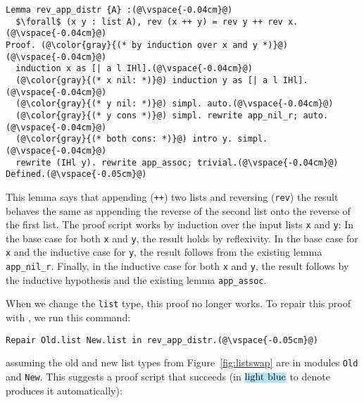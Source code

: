 \begin{lstlisting}
Lemma rev_app_distr {A} :(@\vspace{-0.04cm}@)
  $\forall$ (x y : list A), rev (x ++ y) = rev y ++ rev x.(@\vspace{-0.04cm}@)
Proof. (@\color{gray}{(* by induction over x and y *)}@)(@\vspace{-0.04cm}@)
  induction x as [| a l IHl].(@\vspace{-0.04cm}@)
  (@\color{gray}{(* x nil: *)}@) induction y as [| a l IHl].(@\vspace{-0.04cm}@)
  (@\color{gray}{(* y nil: *)}@) simpl. auto.(@\vspace{-0.04cm}@)
  (@\color{gray}{(* y cons *)}@) simpl. rewrite app_nil_r; auto.(@\vspace{-0.04cm}@)
  (@\color{gray}{(* both cons: *)}@) intro y. simpl.(@\vspace{-0.04cm}@)
  rewrite (IHl y). rewrite app_assoc; trivial.(@\vspace{-0.04cm}@)
Defined.(@\vspace{-0.05cm}@)
\end{lstlisting} %
This lemma says that appending (\lstinline{++}) two lists and reversing (\lstinline{rev}) the result behaves the same as appending
the reverse of the second list onto the reverse of the first list.
The proof script works by induction over the input lists \lstinline{x} and \lstinline{y}:
In the base case for both \lstinline{x} and \lstinline{y}, the result holds by reflexivity.
In the base case for \lstinline{x} and the inductive case for \lstinline{y}, the result follows from the existing lemma \lstinline{app_nil_r}.
Finally, in the inductive case for both \lstinline{x} and \lstinline{y}, the result follows by the inductive hypothesis
and the existing lemma \lstinline{app_assoc}.

When we change the \lstinline{list} type, this proof no longer works.
To repair this proof with \toolnamec, we run this command:

\begin{lstlisting}
Repair Old.list New.list in rev_app_distr.(@\vspace{-0.05cm}@)
\end{lstlisting}
assuming the old and new list types from Figure~\ref{fig:listswap} are in modules \lstinline{Old} and \lstinline{New}.
This suggests a proof script that succeeds (in $\codeauto{light blue}$ to denote \toolnamec produces it automatically):

